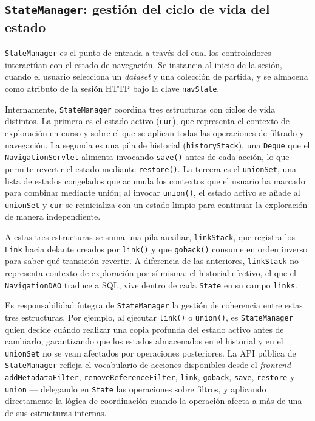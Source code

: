    \subsection{\texttt{StateManager}: gestión del ciclo de vida del estado}

\texttt{StateManager} es el punto de entrada a través del cual los controladores interactúan
con el estado de navegación. Se instancia al inicio de la sesión, cuando el usuario selecciona
un \textit{dataset} y una colección de partida, y se almacena como atributo de la sesión HTTP bajo la
clave \texttt{navState}.

Internamente, \texttt{StateManager} coordina tres estructuras con ciclos de vida distintos.
La primera es el estado activo (\texttt{cur}), que representa el contexto de exploración en
curso y sobre el que se aplican todas las operaciones de filtrado y navegación. La segunda es
una pila de historial (\texttt{historyStack}), una \texttt{Deque} que el
\texttt{NavigationServlet} alimenta invocando \texttt{save()} antes de cada acción, lo que
permite revertir el estado mediante \texttt{restore()}. La tercera es el \texttt{unionSet},
una lista de estados congelados que acumula los contextos que el usuario ha marcado para
combinar mediante unión; al invocar \texttt{union()}, el estado activo se añade al
\texttt{unionSet} y \texttt{cur} se reinicializa con un estado limpio para continuar la
exploración de manera independiente.

A estas tres estructuras se suma una pila auxiliar, \texttt{linkStack}, que registra
los \texttt{Link} hacia delante creados por \texttt{link()} y que \texttt{goback()}
consume en orden inverso para saber qué transición revertir. A diferencia de las
anteriores, \texttt{linkStack} no representa contexto de exploración por sí misma: el
historial efectivo, el que el \texttt{NavigationDAO} traduce a SQL, vive dentro de cada
\texttt{State} en su campo \texttt{links}.

Es responsabilidad íntegra de \texttt{StateManager} la gestión de coherencia entre estas tres estructuras. 
Por ejemplo, al ejecutar \texttt{link()} o \texttt{union()}, es
\texttt{StateManager} quien decide cuándo realizar una copia profunda del estado activo
antes de cambiarlo, garantizando que los estados almacenados en el historial y en el
\texttt{unionSet} no se vean afectados por operaciones posteriores. La API pública
de \texttt{StateManager} refleja el vocabulario de acciones disponibles desde el
\textit{frontend} --- \texttt{addMetadataFilter}, \texttt{removeReferenceFilter}, \texttt{link},
\texttt{goback}, \texttt{save}, \texttt{restore} y \texttt{union} --- delegando en
\texttt{State} las operaciones sobre filtros, y aplicando directamente la lógica de
coordinación cuando la operación afecta a más de una de sus estructuras internas.

